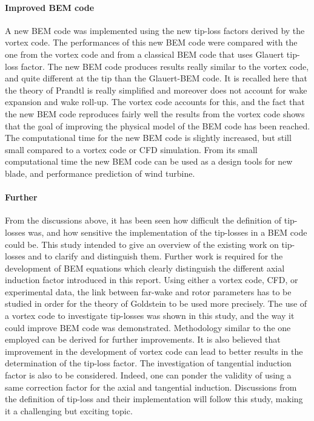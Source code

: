 \documentclass[a4paper,11pt]{book}
\begin{document}
\paragraph{Improved BEM code} A new BEM code was implemented using the new tip-loss factors derived by the vortex code. The performances of this new BEM code were compared with the one from the vortex code and from a classical BEM code that uses Glauert tip-loss factor. The new BEM code produces results really similar to the vortex code, and quite different at the tip than the Glauert-BEM code. It is recalled here that the theory of Prandtl is really simplified and moreover does not account for wake expansion and wake roll-up. The vortex code accounts for this, and the fact that the new BEM code reproduces fairly well the results from the vortex code shows that the goal of improving the physical model of the BEM code has been reached. The computational time for the new BEM code is slightly increased, but still small compared to a vortex code or CFD simulation. From its small computational time the new BEM code can be used as a design tools for new blade, and performance prediction of wind turbine.


\paragraph{Further} From the discussions above, it has been seen how difficult the definition of tip-losses was, and how sensitive the implementation of the tip-losses in a BEM code could be. This study intended to give an overview of the existing work on tip-losses and to clarify and distinguish them. Further work is required for the development of BEM equations which clearly distinguish the different axial induction factor introduced in this report. Using either a vortex code, CFD, or experimental data, the link between far-wake and rotor parameters has to be studied in order for the theory of Goldstein to be used more precisely. The use of a vortex code to investigate tip-losses was shown in this study, and the way it could improve BEM code was demonstrated. Methodology similar to the one employed can be derived for further improvements.
 It is also believed that improvement in the development of vortex code can lead to better results in the determination of the tip-loss factor. The investigation of tangential induction factor is also to be considered. Indeed, one can ponder the validity of using a same correction factor for the axial and tangential induction. Discussions from the definition of tip-loss and their implementation will follow this study, making it a challenging but exciting topic.
\end{document}
